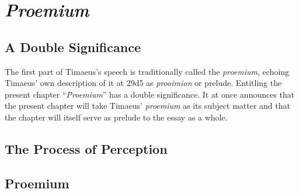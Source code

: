 
\chapter{\emph{Proemium}} %
\label{cha:proemium}

\section{A Double Significance} %
\label{sec:a_double_significance}

The first part of Timaeus's speech is traditionally called the \emph{proemium}, echoing Timaeus' own description of it at 29d5 as \emph{prooimion} or prelude. Entitling the present chapter ``\emph{Proemium}'' has a double significance. It at once announces that the present chapter will take Timaeus' \emph{proemium} as its subject matter and that the chapter will itself serve as prelude to the essay as a whole.


\section{The Process of Perception} %
\label{sec:the_process_of_perception}




\section{Proemium} %
\label{sec:proemium}




